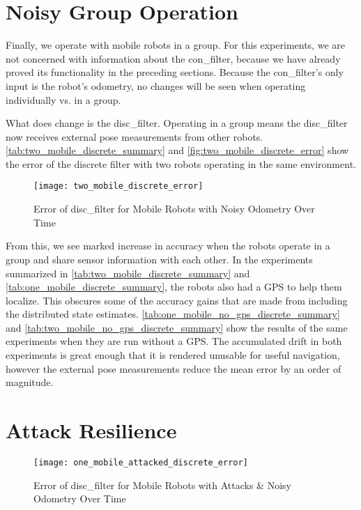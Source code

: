 \documentclass[thesis.tex]{subfile}
\begin{document}
\section{Noisy Group Operation}
Finally, we operate with mobile robots in a group. For this experiments, we are not concerned with information about the \gls{con_filter}, because we have already proved its functionality in the preceding sections. Because the \gls{con_filter}'s only input is the robot's odometry, no changes will be seen when operating individually vs. in a group.

What does change is the \gls{disc_filter}. Operating in a group means the \gls{disc_filter} now receives external pose measurements from other robots. \autoref{tab:two_mobile_discrete_summary} and \autoref{fig:two_mobile_discrete_error} show the error of the discrete filter with two robots operating in the same environment.



\begin{figure}
\centering
\texttt{[image: two\_mobile\_discrete\_error]}
\caption{Error of \gls{disc_filter} for Mobile Robots with Noisy Odometry Over Time}
\label{fig:two_mobile_discrete_error}
\end{figure}

From this, we see marked increase in accuracy when the robots operate in a group and share sensor information with each other. In the experiments summarized in \autoref{tab:two_mobile_discrete_summary} and \autoref{tab:one_mobile_discrete_summary}, the robots also had a GPS to help them localize. This obscures some of the accuracy gains that are made from including the distributed state estimates. \autoref{tab:one_mobile_no_gps_discrete_summary} and \autoref{tab:two_mobile_no_gps_discrete_summary} show the results of the same experiments when they are run without a GPS. The accumulated drift in both experiments is great enough that it is rendered unusable for useful navigation, however the external pose measurements reduce the mean error by an order of magnitude.




\section{Attack Resilience}


\begin{figure}
\centering
\texttt{[image: one\_mobile\_attacked\_discrete\_error]}
\caption{Error of \gls{disc_filter} for Mobile Robots with Attacks \& Noisy Odometry Over Time}
\label{fig:one_mobile_attacked_discrete_error}
\end{figure}
\end{document}
